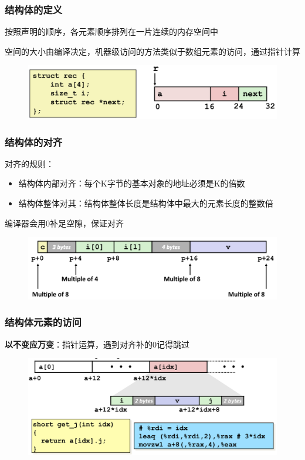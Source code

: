 \documentclass[12pt,AutoFakeBold,aspectratio=169,mathserif]{beamer}
\begin{document}
    \begin{frame}
        \frametitle{结构体的定义}
    
        按照声明的顺序，各元素顺序排列在一片连续的内存空间中

        空间的大小由编译决定，机器级访问的方法类似于数组元素的访问，通过指针计算

        \begin{figure}
            \includegraphics[width=.8\textwidth]{figures/strcut.png}
        \end{figure}
    
    \end{frame}

    \begin{frame}
        \frametitle{结构体的对齐}
    
        对齐的规则：
        \begin{itemize}
            \item 结构体内部对齐：每个K字节的基本对象的地址必须是K的倍数
            \item 结构体整体对其：结构体整体长度是结构体中最大的元素长度的整数倍
        \end{itemize}

        编译器会用0补足空隙，保证对齐

        \begin{figure}
            \includegraphics[width=.8\textwidth]{figures/align.png}
        \end{figure}
    
    \end{frame}

    \begin{frame}
        \frametitle{结构体元素的访问}
    
        \textbf{以不变应万变}：指针运算，遇到对齐补的0记得跳过

        \begin{figure}
            \includegraphics[width=.8\textwidth]{figures/visit.png}
        \end{figure}
    
    \end{frame}
\end{document}
